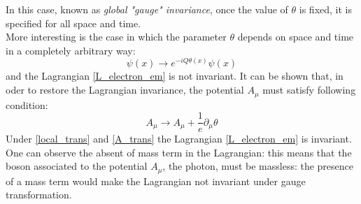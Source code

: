 In this case, known as \textit{global "gauge" invariance}, once the value of $\theta$ is fixed, it is specified for all space and time. \\
More interesting is the case in which the parameter $\theta$ depends on space and time in a completely arbitrary way:
\begin{equation}
\psi(x)\to e^{-iQ\theta(x)} \psi(x)
\label{local_trans}
\end{equation}
and the Lagrangian \ref{L_electron_em} is not invariant.
It can be shown that, in oder to restore the Lagrangian invariance, the potential $A_{\mu}$ must satisfy following condition:
\begin{equation}
A_{\mu} \to A_{\mu} + \frac{1}{e}\partial_{\mu}\theta
\label{A_trans}
\end{equation}
Under \ref{local_trans} and \ref{A_trans} the Lagrangian \ref{L_electron_em} is invariant.\\ 
One can observe the absent of mass term in the Lagrangian: this means that the boson associated to the potential $A_{\mu}$, the photon, must be massless: the presence of a mass term would make the Lagrangian not invariant under gauge transformation. \\

